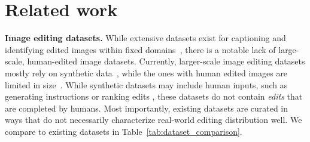 \section{Related work}
\noindent\textbf{Image editing datasets.}
While extensive datasets exist for captioning and identifying edited images within fixed domains~\cite{desai2021redcaps, park2018double}, there is a notable lack of large-scale, human-edited image datasets.
Currently, larger-scale image editing datasets mostly rely on synthetic data~\cite{brooks2023instructpix2pix, zhang2024magicbrush, sheynin2024emu, zhang2024hive, zhao2024ultraedit}, while the ones with human edited images are limited in size~\cite{shi2020benchmark, tan2019expressing}.
While synthetic datasets may include human inputs, such as generating instructions or ranking edits \cite{zhang2024magicbrush, zhang2024hive, brooks2023instructpix2pix}, these datasets do not contain \textit{edits} that are completed by humans.
Most importantly, existing datasets are curated in ways that do not necessarily characterize real-world editing distribution well. We compare \RealEdit to existing datasets in Table~\ref{tab:dataset_comparison}.



